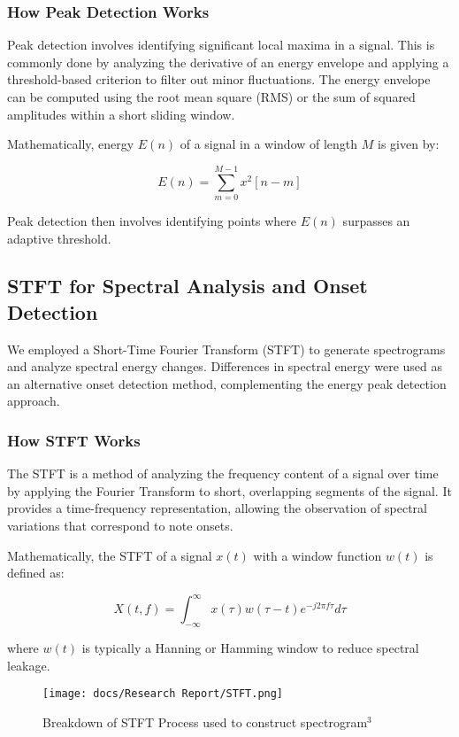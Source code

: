 \documentclass{article}
\begin{document}
\subsubsection{How Peak Detection Works}
Peak detection involves identifying significant local maxima in a signal. This is commonly done by analyzing the derivative of an energy envelope and applying a threshold-based criterion to filter out minor fluctuations. The energy envelope can be computed using the root mean square (RMS) or the sum of squared amplitudes within a short sliding window.

Mathematically, energy $E(n)$ of a signal in a window of length $M$ is given by:

\begin{equation}
E(n) = \sum_{m=0}^{M-1} x^2[n-m]
\end{equation}

Peak detection then involves identifying points where $E(n)$ surpasses an adaptive threshold.

\subsection{STFT for Spectral Analysis and Onset Detection}
We employed a Short-Time Fourier Transform (STFT) to generate spectrograms and analyze spectral energy changes. Differences in spectral energy were used as an alternative onset detection method, complementing the energy peak detection approach.

\subsubsection{How STFT Works}
The STFT is a method of analyzing the frequency content of a signal over time by applying the Fourier Transform to short, overlapping segments of the signal. It provides a time-frequency representation, allowing the observation of spectral variations that correspond to note onsets.

Mathematically, the STFT of a signal $x(t)$ with a window function $w(t)$ is defined as:

\begin{equation}
X(t, f) = \int_{-\infty}^{\infty} x(\tau) w(\tau - t) e^{-j 2\pi f \tau} d\tau
\end{equation}

where $w(t)$ is typically a Hanning or Hamming window to reduce spectral leakage.

\begin{figure}[h]
\texttt{[image: docs/Research Report/STFT.png]}
\caption{Breakdown of STFT Process used to construct spectrogram$^3$}
\end{figure}
\end{document}
